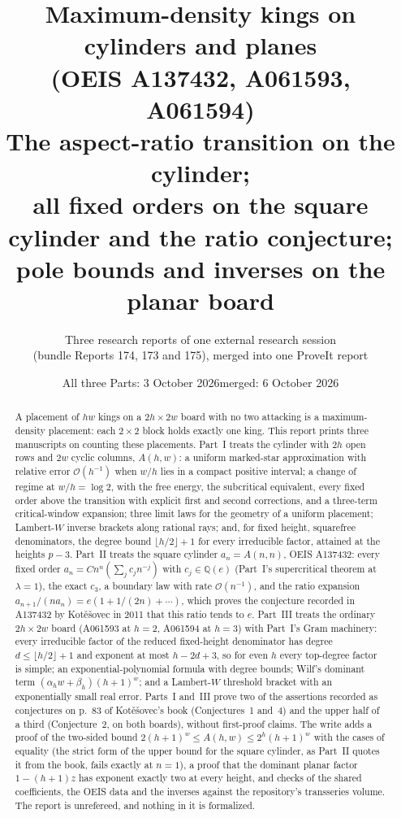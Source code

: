 \documentclass[11pt,letterpaper]{article}
\title{\textbf{Maximum-density kings on cylinders and planes\\ (OEIS A137432, A061593, A061594)}\\[7pt]
\large The aspect-ratio transition on the cylinder;\\ all fixed orders on the square cylinder and the ratio conjecture;\\ pole bounds and inverses on the planar board}
\author{Three research reports of one external research session\\(bundle Reports 174, 173 and 175), merged into one ProveIt report}
\date{All three Parts: 3 October 2026\quad merged: 6 October 2026}
\numberwithin{equation}{section}
\theoremstyle{remark}\newtheorem{remark}[theorem]{Remark}
\newcommand{\Oh}{\mathcal O}\newcommand{\Q}{\mathbb Q}\newcommand{\N}{\mathbb N}\newcommand{\R}{\mathbb R}
\begin{document}
\hypersetup{pageanchor=false}
\maketitle
\begin{abstract}
A placement of $hw$ kings on a $2h\times2w$ board with no two attacking is a maximum-density placement: each $2\times2$ block holds exactly one king. This report prints three manuscripts on counting these placements. Part~I treats the cylinder with $2h$ open rows and $2w$ cyclic columns, $A(h,w)$: a uniform marked-star approximation with relative error $\Oh(h^{-1})$ when $w/h$ lies in a compact positive interval; a change of regime at $w/h=\log2$, with the free energy, the subcritical equivalent, every fixed order above the transition with explicit first and second corrections, and a three-term critical-window expansion; three limit laws for the geometry of a uniform placement; Lambert-$W$ inverse brackets along rational rays; and, for fixed height, squarefree denominators, the degree bound $\lfloor h/2\rfloor+1$ for every irreducible factor, attained at the heights $p-3$. Part~II treats the square cylinder $a_n=A(n,n)$, OEIS A137432: every fixed order $a_n=Cn^n(\sum_jc_jn^{-j})$ with $c_j\in\Q(e)$ (Part~I's supercritical theorem at $\lambda=1$), the exact $c_3$, a boundary law with rate $\Oh(n^{-1})$, and the ratio expansion $a_{n+1}/(na_n)=e(1+1/(2n)+\cdots)$, which proves the conjecture recorded in A137432 by Kot\v e\v sovec in 2011 that this ratio tends to $e$. Part~III treats the ordinary $2h\times2w$ board (A061593 at $h=2$, A061594 at $h=3$) with Part~I's Gram machinery: every irreducible factor of the reduced fixed-height denominator has degree $d\le\lfloor h/2\rfloor+1$ and exponent at most $h-2d+3$, so for even $h$ every top-degree factor is simple; an exponential-polynomial formula with degree bounds; Wilf's dominant term $(\alpha_hw+\beta_h)(h+1)^w$; and a Lambert-$W$ threshold bracket with an exponentially small real error. Parts~I and~III prove two of the assertions recorded as conjectures on p.~83 of Kot\v e\v sovec's book (Conjectures~1 and~4) and the upper half of a third (Conjecture~2, on both boards), without first-proof claims. The write adds a proof of the two-sided bound $2(h+1)^w\le A(h,w)\le2^h(h+1)^w$ with the cases of equality (the strict form of the upper bound for the square cylinder, as Part~II quotes it from the book, fails exactly at $n=1$), a proof that the dominant planar factor $1-(h+1)z$ has exponent exactly two at every height, and checks of the shared coefficients, the OEIS data and the inverses against the repository's transseries volume. The report is unrefereed, and nothing in it is formalized.
\end{abstract}
\hypersetup{pageanchor=true}
{\small\setlength{\parskip}{0pt}\tableofcontents}
\newpage
\end{document}
